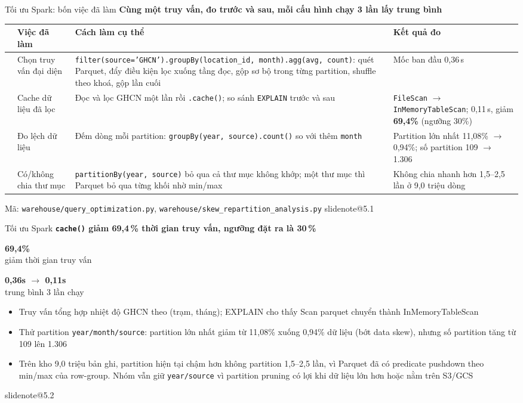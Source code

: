 \documentclass[t,aspectratio=169,12pt]{beamer}
\makeatletter
\newcommand{\slidenote}[1]{\ifcsname slidenote@#1\endcsname\note{\csname slidenote@#1\endcsname}\fi}
\newcommand{\ychinh}[1]{\vskip1mm{\bfseries #1}\par\vskip1mm}
\newcommand{\nguon}[1]{\vskip1mm{\scriptsize\color{mutedgray}#1}}
\newcommand{\bignum}[4]{%
  \begin{minipage}[t]{#4}\centering
    {\fontsize{30}{34}\selectfont\bfseries\color{#3}#1}\\[2pt]
    {\small #2}\end{minipage}}
\newcommand{\bignumS}[4]{%
  \begin{minipage}[t]{#4}\centering
    {\fontsize{22}{26}\selectfont\bfseries\color{#3}#1}\\[1pt]
    {\footnotesize #2}\end{minipage}}
\makeatother
\begin{document}
\begin{frame}{Tối ưu Spark: bốn việc đã làm}
  \ychinh{Cùng một truy vấn, đo trước và sau, mỗi cấu hình chạy 3 lần lấy trung bình}
  \scriptsize
  \renewcommand{\arraystretch}{1.1}
  \begin{tabular}{@{}>{\raggedright\arraybackslash}p{0.25cm}>{\raggedright\arraybackslash}p{2.2cm}>{\raggedright\arraybackslash}p{6.5cm}>{\raggedright\arraybackslash}p{4.3cm}@{}}
    \toprule
    & \textbf{Việc đã làm} & \textbf{Cách làm cụ thể} & \textbf{Kết quả đo} \\
    \midrule
    1 & Chọn truy vấn đại diện &
      \texttt{filter(source='GHCN').groupBy(location\_id, month).agg(avg, count)}: quét Parquet, đẩy điều kiện lọc
      xuống tầng đọc, gộp sơ bộ trong từng partition, shuffle theo khoá, gộp lần cuối &
      Mốc ban đầu 0,36\,s \\
    2 & Cache dữ liệu đã lọc &
      Đọc và lọc GHCN một lần rồi \texttt{.cache()}; so sánh \texttt{EXPLAIN} trước và sau &
      \texttt{FileScan} $\to$ \texttt{InMemoryTableScan}; 0,11\,s, giảm \textbf{69,4\%} (ngưỡng 30\%) \\
    3 & Đo lệch dữ liệu &
      Đếm dòng mỗi partition: \texttt{groupBy(year, source).count()} so với thêm \texttt{month} &
      Partition lớn nhất 11,08\% $\to$ 0,94\%; số partition 109 $\to$ 1.306 \\
    4 & Có/không chia thư mục &
      \texttt{partitionBy(year, source)} bỏ qua cả thư mục không khớp; một thư mục thì Parquet bỏ qua từng khối nhờ min/max &
      Không chia nhanh hơn 1,5--2,5 lần ở 9,0 triệu dòng \\
    \bottomrule
  \end{tabular}
  \nguon{Mã: \texttt{warehouse/query\_optimization.py}, \texttt{warehouse/skew\_repartition\_analysis.py}}
  \slidenote{5.1}
\end{frame}
\begin{frame}{Tối ưu Spark}
  \ychinh{\texttt{cache()} giảm 69,4\,\% thời gian truy vấn, ngưỡng đặt ra là 30\,\%}
  \begin{center}
    \bignum{69,4\%}{giảm thời gian truy vấn}{goodgreen}{5cm}
    \bignumS{0,36s $\to$ 0,11s}{trung bình 3 lần chạy}{hustblue}{5cm}
  \end{center}
  \begin{itemize}\footnotesize\setlength\itemsep{1mm}
    \item Truy vấn tổng hợp nhiệt độ GHCN theo (trạm, tháng); EXPLAIN cho thấy Scan parquet chuyển thành InMemoryTableScan
    \item Thử partition \texttt{year/month/source}: partition lớn nhất giảm từ 11,08\% xuống 0,94\% dữ liệu (bớt data skew), nhưng số partition tăng từ 109 lên 1.306
    \item Trên kho 9,0 triệu bản ghi, partition hiện tại chậm hơn không partition 1,5--2,5 lần, vì Parquet đã có predicate pushdown theo min/max của row-group. Nhóm vẫn giữ \texttt{year/source} vì partition pruning có lợi khi dữ liệu lớn hơn hoặc nằm trên S3/GCS
  \end{itemize}
  \slidenote{5.2}
\end{frame}
\end{document}
